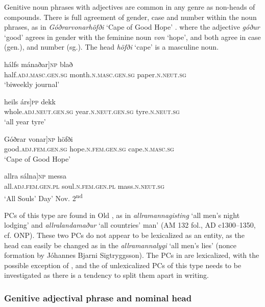 \documentclass[output=paper]{LSP/langsci}
\begin{document}
\begin{xlist}
Genitive noun phrases with adjectives are common in any genre as non-heads of compounds.  There is full agreement of gender, case and number within the noun phrases, as in \textit{Góðrarvonarhöfði} ‘Cape of Good Hope’ . where the adjective \textit{góður} ‘good’ agrees in gender with the feminine noun \textit{von} ‘hope’, and both agree in case (gen.), and number (sg.). The head \textit{höfði} ‘cape’ is a masculine noun.

\ea%
 \label{ex:bjarnadottir:15} 
\ea \label{ex:bjarnadottir:15a} 
\gll {\ob}hálfs mánaðar]\textsc{np}  blað \\
 half\textsc{.adj.masc.gen.sg} month\textsc{.n.masc.gen.sg} paper\textsc{.n.neut.sg}\\
\glt ‘biweekly journal’

\ex \label{ex:bjarnadottir:15b} 
\gll {\ob}heils árs]\textsc{pp} dekk\\
 whole\textsc{.adj.neut.gen.sg} year\textsc{.n.neut.gen.sg} tyre\textsc{.n.neut.sg}\\
\glt ‘all year tyre’

\ex \label{ex:bjarnadottir:15c} 
\gll {\ob}Góðrar vonar]\textsc{np} höfði\\
 good\textsc{.adj.fem.gen.sg} hope\textsc{.n.fem.gen.sg} cape\textsc{.n.masc.sg}\\
\glt ‘Cape of Good Hope’

\ex \label{ex:bjarnadottir:15d} 
\gll {\ob}allra sálna]\textsc{np} messa\\
 all\textsc{.adj.fem.gen.pl} soul\textsc{.n.fem.gen.pl} mass\textsc{.n.neut.sg}\\
\glt ‘All Souls’ Day’ Nov. 2\textsuperscript{nd}
\z
\z

PCs of this type are found in Old , as in \textit{allramannagisting} ‘all men’s night lodging’ and \textit{allralandamaður} ‘all countries’ man’ (AM 132 fol., AD c1300–1350, cf. ONP). These two PCs do not appear to be lexicalized as an entity, as the head can easily be changed as in the  \textit{allramannalygi} ‘all men’s lies’ (nonce 
formation by Jóhannes Bjarni Sigtryggsson). The PCs in  are lexicalized, with the possible exception of , and the  of unlexicalized PCs of this type needs to be investigated as there is a tendency to split them apart in writing. 

\subsubsection{Genitive adjectival phrase and nominal head}\label{sec:bjarnadottir:3.1.2}


\end{xlist}
\end{document}
